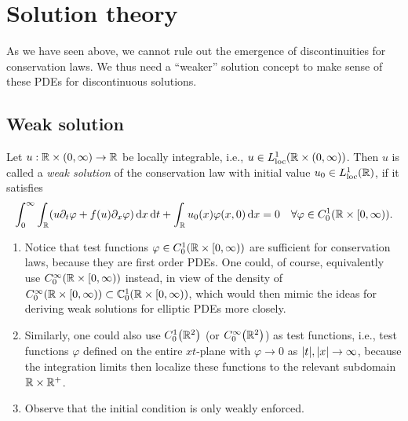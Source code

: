 \section{Solution theory}

As we have seen above, we cannot rule out the emergence of discontinuities for conservation laws. We thus need a ``weaker'' solution concept to make sense of these PDEs for discontinuous solutions.


\subsection{Weak solution}

\begin{definition}
	Let \(u: \R \times \parentheses*{0, \infty} \to \R\) be locally integrable, i.e., \(u \in L_{\text{loc}}^1\parentheses*{\R \times \parentheses*{0, \infty}}\).
	Then \(u\) is called a \emph{weak solution} of the conservation law with initial value \(u_0 \in L_{\text{loc}}^1\parentheses*{\R}\), if it satisfies
	\[
		\int_0^\infty \int_\R \parentheses*{u\partial_t \varphi + f\parentheses*{u}\partial_x \varphi}\d x\d t + \int_\R u_0\parentheses*{x}\varphi\parentheses*{x, 0}\d x = 0 \quad \forall \varphi \in C_0^1\parentheses*{\R \times \left[0, \infty\right)}.
	\]
\end{definition}

\begin{remark}
	\begin{enumerate}
		\item Notice that test functions \(\varphi \in C_0^1\parentheses*{\R \times \left[0, \infty\right)}\) are sufficient for conservation laws, because they are first order PDEs.
		One could, of course, equivalently use \(C_0^\infty\parentheses*{\R \times \left[0, \infty\right)}\) instead, in view of the density of \(C_0^\infty\parentheses*{\R \times \left[0, \infty\right)} \subset \C_0^1\parentheses*{\R \times \left[0, \infty\right)}\), which would then mimic the ideas for deriving weak solutions for elliptic PDEs more closely.
		\item Similarly, one could also use \(C_0^1\parentheses*{\R^2}\) (or \(C_0^\infty\parentheses*{\R^2}\)) as test functions, i.e., test functions \(\varphi\) defined on the entire \(xt\)-plane with \(\varphi \to 0\) as \(\absolute*{t}, \absolute*{x} \to \infty\), because the integration limits then localize these functions to the relevant subdomain \(\R \times \R^+\).
		\item Observe that the initial condition is only weakly enforced.
	\end{enumerate}
\end{remark}

